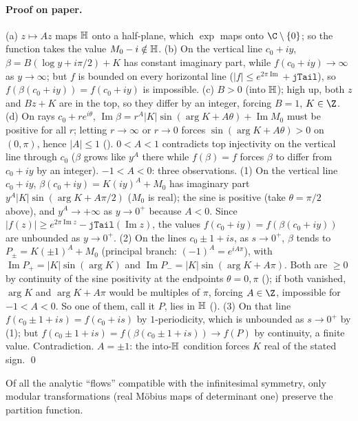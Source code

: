 \paragraph{Proof on paper.}  (a) $z\mapsto Az$ maps $\mathbb{H}$ onto a half-plane, which $\exp$ maps onto $\C\setminus\{0\}$; so the function takes
the value $M_0-i\notin\mathbb{H}$.  (b) On the vertical line $c_0+iy$, $\beta=B(\log y+i\pi/2)+K$ has constant imaginary part, while
$f(c_0+iy)\to\infty$ as $y\to\infty$; but $f$ is bounded on every horizontal line ($|f|\le e^{2\pi\operatorname{Im}}+\mathtt{jTail}$), so
$f(\beta(c_0+iy))=f(c_0+iy)$ is impossible.  (c) $B>0$ (into $\mathbb{H}$); high up, both $z$ and $Bz+K$ are in the top, so they differ by an
integer, forcing $B=1$, $K\in\Z$.  (d) On rays $c_0+re^{i\theta}$, $\operatorname{Im}\beta=r^A|K|\sin(\arg K+A\theta)+\operatorname{Im}M_0$ must be positive
for all $r$; letting $r\to\infty$ or $r\to0$ forces $\sin(\arg K+A\theta)>0$ on $(0,\pi)$, hence $|A|\le1$ ().
$0<A<1$ contradicts top injectivity on the vertical line through $c_0$ ($\beta$ grows like $y^A$ there while $f(\beta)=f$ forces $\beta$ to differ
from $c_0+iy$ by an integer).  $-1<A<0$: three observations.  (1) On the vertical line $c_0+iy$, $\beta(c_0+iy)=K(iy)^A+M_0$ has imaginary part
$y^A|K|\sin(\arg K+A\pi/2)$ ($M_0$ is real); the sine is positive (take $\theta=\pi/2$ above), and $y^A\to+\infty$ as $y\to0^+$ because
$A<0$.  Since $|f(z)|\ge e^{2\pi\operatorname{Im}z}-\mathtt{jTail}(\operatorname{Im}z)$, the values $f(c_0+iy)=f(\beta(c_0+iy))$ are unbounded
as $y\to0^+$.  (2) On the lines $c_0\pm1+is$, as $s\to0^+$, $\beta$ tends to $P_\pm=K(\pm1)^A+M_0$ (principal branch: $(-1)^A=e^{iA\pi}$),
with $\operatorname{Im}P_+=|K|\sin(\arg K)$ and $\operatorname{Im}P_-=|K|\sin(\arg K+A\pi)$.  Both are $\ge0$ by continuity of the sine
positivity at the endpoints $\theta=0,\pi$ (); if both vanished, $\arg K$ and $\arg K+A\pi$ would be multiples of
$\pi$, forcing $A\in\Z$, impossible for $-1<A<0$.  So one of them, call it $P$, lies in $\mathbb{H}$ ().
(3) On that line $f(c_0\pm1+is)=f(c_0+is)$ by $1$-periodicity, which is unbounded as $s\to0^+$ by (1); but
$f(c_0\pm1+is)=f(\beta(c_0\pm1+is))\to f(P)$ by continuity, a finite value.  Contradiction.  $A=\pm1$: the into-$\mathbb{H}$ condition forces $K$ real of the stated sign. \qed
\begin{physics}Of all the analytic ``flows'' compatible with the infinitesimal symmetry, only modular transformations (real
M\"obius maps of determinant one) preserve the partition function.\end{physics}
